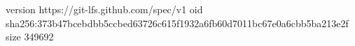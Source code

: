 version https://git-lfs.github.com/spec/v1
oid sha256:373b47bcebdbb5ccbed63726c615f1932a6fb60d7011bc67e0a6cbb5ba213e2f
size 349692
